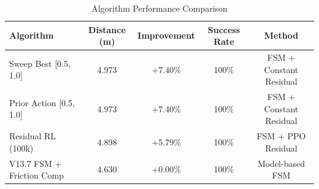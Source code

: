 
\begin{table}[htbp]
\centering
\caption{Algorithm Performance Comparison}
\label{tab:algorithm_comparison}
\begin{tabular}{lcccc}
\hline
Algorithm & Distance (m) & Improvement & Success Rate & Method \\
\hline
Sweep Best [0.5, 1.0] & 4.973 & +7.40\% & 100\% & FSM + Constant Residual \\
Prior Action [0.5, 1.0] & 4.973 & +7.40\% & 100\% & FSM + Constant Residual \\
Residual RL (100k) & 4.898 & +5.79\% & 100\% & FSM + PPO Residual \\
V13.7 FSM + Friction Comp & 4.630 & +0.00\% & 100\% & Model-based FSM \\
\hline
\end{tabular}
\end{table}
